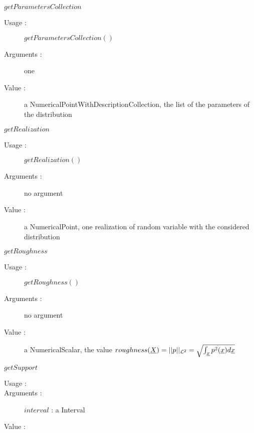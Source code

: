 \begin{description}
\begin{description}
  \item $getParametersCollection$
    \begin{description}
    \item[Usage :] $getParametersCollection()$
    \item[Arguments :] one
    \item[Value :] a NumericalPointWithDescriptionCollection, the list of the parameters of the distribution

    \end{description}
    \bigskip


  \item $getRealization$
    \begin{description}
    \item[Usage :] $getRealization()$
    \item[Arguments :] no argument
    \item[Value :] a NumericalPoint, one realization of random variable with the considered distribution
    \end{description}
    \bigskip

  \item $getRoughness$
    \begin{description}
    \item[Usage :] $getRoughness()$
    \item[Arguments :] no argument
    \item[Value :] a NumericalScalar, the value $roughness({\underline{X}}) = ||p||_{\mathcal{L}^2} = \sqrt{\int_{\underline{x}} p^2({\underline{x}})d{\underline{x}}}$
    \end{description}
    \bigskip

  \item $getSupport$
    \begin{description}
    \item[Usage :] \rule{0pt}{1em}
    \item[Arguments :] $interval$ : a Interval
    \item[Value :] \rule{0pt}{1em}
    \end{description}
    \bigskip


\end{description}
\end{description}
